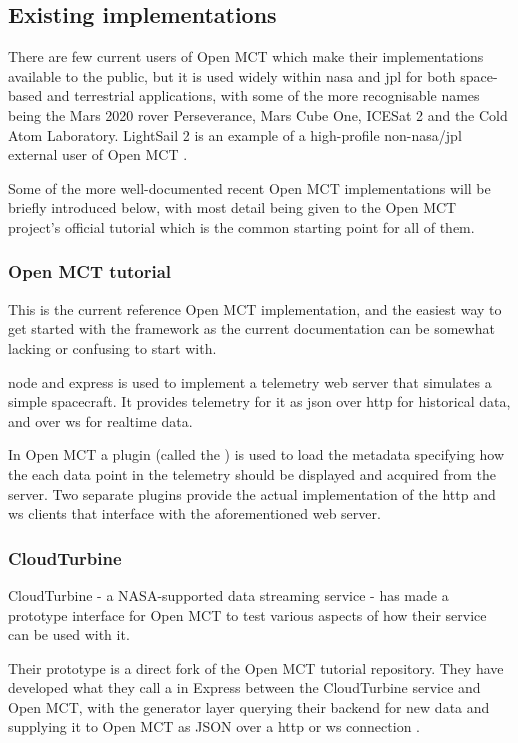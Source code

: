 \subsection{Existing implementations}
There are few current users of Open MCT which make their implementations available to the public, but it is used widely within \acrshort{nasa} and \acrshort{jpl} for both space-based and terrestrial applications, with some of the more recognisable names being the Mars 2020 rover Perseverance, Mars Cube One, ICESat 2 and the Cold Atom Laboratory. LightSail 2 is an example of a high-profile non-\acrshort{nasa}/\acrshort{jpl} external user of Open MCT \cite{omct_users}. 

Some of the more well-documented recent Open MCT implementations will be briefly introduced below, with most detail being given to the Open MCT project's official tutorial which is the common starting point for all of them.

\subsubsection{Open MCT tutorial}
This is the current reference Open MCT implementation, and the easiest way to get started with the framework as the current documentation can be somewhat lacking or confusing to start with.

\Gls{node} and \Gls{express} is used to implement a telemetry web server that simulates a simple spacecraft. It provides telemetry for it as \acrshort{json} over \acrshort{http} for historical data, and over \Gls{ws} for realtime data.

In Open MCT a plugin (called the ) is used to load the \gls{metadata} specifying how the each data point in the telemetry should be displayed and acquired from the server. Two separate plugins provide the actual implementation of the \acrshort{http} and \Gls{ws} clients that interface with the aforementioned web server.


\subsubsection{CloudTurbine}
CloudTurbine - a NASA-supported data streaming service - has made a prototype interface for Open MCT to test various aspects of how their service can be used with it.

Their prototype is a direct fork of the Open MCT tutorial repository. They have developed what they call a  in Express between the CloudTurbine service and Open MCT, with the generator layer querying their backend for new data and supplying it to Open MCT as JSON over a \acrshort{http} or \Gls{ws} connection \cite{cloudturbine}. 

